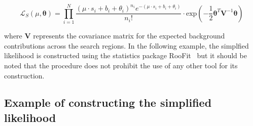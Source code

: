 \begin{equation}
\mathcal{L}_{S}(\mu, \boldsymbol{\theta}) =  \prod_{i=1}^{N} \dfrac{(\mu \cdot s_{i}+b_{i}+\theta_{i})^{n_{i}} e^{-(\mu \cdot s_{i}+b_{i}+\theta_{i})} }{n_{i}!} \cdot  
\mathrm{exp}\left(-\dfrac{1}{2} \boldsymbol{\theta}^{T}\mathrm{\mathbf{V}}^{-1}\boldsymbol{\theta} \right)
\label{eq:full-likelihood}
\end{equation}

where $\mathrm{\mathbf{V}}$ represents the covariance matrix for the expected background contributions across the search regions.
In the following example, the simplfied likelihood is constructed using the statistics package {\sc RooFit}~\cite{roofit} but it should be noted that 
the procedure does not prohibit the use of any other tool for its construction. 

\subsection{Example of constructing the simplified likelihood}
\label{sec:sl-toy}

